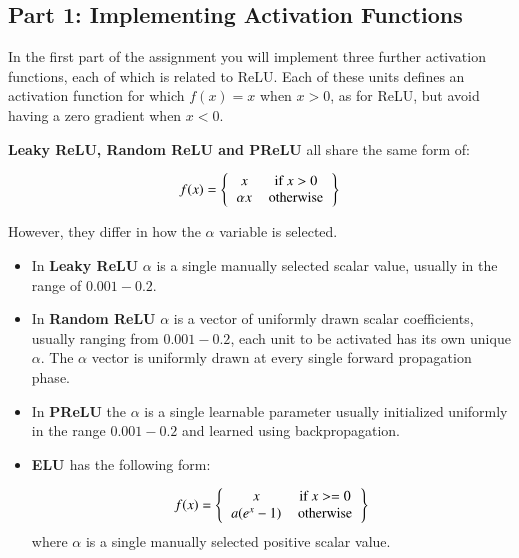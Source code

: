 \documentclass[11pt,]{article}
\begin{document}
\subsection{Part 1: Implementing Activation Functions}\label{sec:activation-functions}
In the first part of the assignment you will implement three further activation functions, each of which is related to ReLU. Each of these units defines an activation function for which $f(x)=x$ when $x>0$, as for ReLU, but avoid having a zero gradient when $x<0$.

\textbf{Leaky ReLU, Random ReLU and PReLU} all share the same form of:

\begin{equation} \label{eq: lrelu}
f(x) = \left \{
\begin{tabular}{cc}
$x$ & if $x>0$  \\
$\alpha x$ & otherwise
\end{tabular}
\right \}
\end{equation}

However, they differ in how the $\alpha$ variable is selected. 
\begin{itemize}
    \item In \textbf{Leaky ReLU} $\alpha$ is a single manually selected scalar value, usually in the range of $0.001 - 0.2$. 
    \item In \textbf{Random ReLU} $\alpha$ is a vector of uniformly drawn scalar coefficients, usually ranging from $0.001 - 0.2$, each unit to be activated has its own unique $\alpha$. The $\alpha$ vector is uniformly drawn at every single forward propagation phase. 
    \item In \textbf{PReLU} the $\alpha$ is a single learnable parameter usually initialized uniformly in the range $0.001 - 0.2$ and learned using backpropagation.
    \item \textbf{ELU \cite{clevert2015fast}} has the following form:
    
    \begin{equation} \label{eq: elu}f(x) = \left \{
    \begin{tabular}{cc}
    $x$ & if $x>=0$  \\
    $a(e^x - 1)$ & otherwise
    \end{tabular}
    \right \}
    \end{equation} where $\alpha$ is a single manually selected positive scalar value.
\end{itemize}
\end{document}
